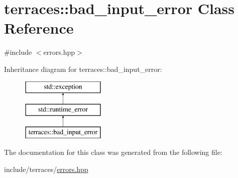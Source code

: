 \hypertarget{classterraces_1_1bad__input__error}{}\section{terraces\+:\+:bad\+\_\+input\+\_\+error Class Reference}
\label{classterraces_1_1bad__input__error}


{\ttfamily \#include $<$errors.\+hpp$>$}

Inheritance diagram for terraces\+:\+:bad\+\_\+input\+\_\+error\+:\begin{figure}[H]
\begin{center}
\leavevmode
\includegraphics[height=3.000000cm]{classterraces_1_1bad__input__error}
\end{center}
\end{figure}


The documentation for this class was generated from the following file\+:\begin{DoxyCompactItemize}
\item 
include/terraces/\hyperlink{errors_8hpp}{errors.\+hpp}\end{DoxyCompactItemize}
